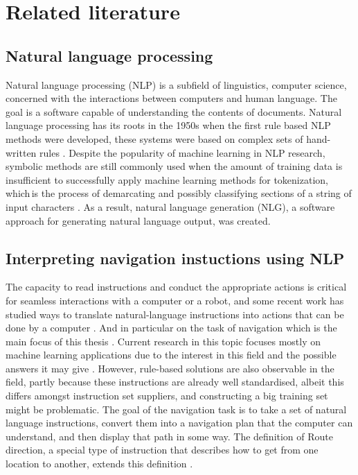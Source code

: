 \section{Related literature}

\subsection{Natural language processing }

Natural language processing (NLP) is a subfield of linguistics, computer science, concerned with the interactions between computers and human language. The goal is a software capable of understanding the contents of documents. Natural language processing has its roots in the 1950s when the first rule based NLP methods were developed, these systems were based on complex sets of hand-written rules \cite{guida1986evaluation}. Despite the popularity of machine learning in NLP research, symbolic methods are still commonly used when the amount of training data is insufficient to successfully apply machine learning methods for tokenization, which is the process of demarcating and possibly classifying sections of a string of input characters  \cite{hutchins2005history}. As a result, natural language generation (NLG), a software approach for generating natural language output, was created.  
 \subsection{Interpreting navigation instuctions using NLP}

	The capacity to read instructions and conduct the appropriate actions is critical for seamless interactions with a computer or a robot, and some recent work has studied ways to translate natural-language instructions into actions that can be done by a computer \cite{lau2009interpreting} \cite{branavan2009reinforcement}. And in particular on the task of navigation which is the main focus of this thesis \cite{macmahon2006walk}. Current research in this topic focuses mostly on machine learning applications due to the interest in this field and the possible answers it may give \cite{hashimoto2016joint}. However, rule-based solutions are also observable in the field, partly because these instructions are already well standardised, albeit this differs amongst instruction set suppliers, and constructing a big training set might be problematic. The goal of the navigation task is to take a set of natural language instructions, convert them into a navigation plan that the computer can understand, and then display that path in some way. The definition of Route direction, a special type of instruction that describes how to get from one location to another, extends this definition \cite{wunderlich1982get}.\\
	
